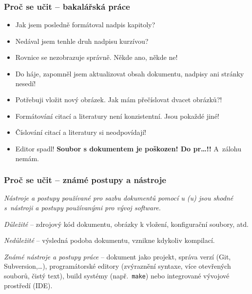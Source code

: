\begin{frame}
	\frametitle{Proč se učit  -- bakalářská práce}
	\begin{itemize}
		\item Jak jsem posledně formátoval nadpis kapitoly?
		\item Nedával jsem tenhle druh nadpisu kurzívou?
		\item Rovnice se nezobrazuje správně. Někde ano, někde ne!
		\item Do háje, zapomněl jsem aktualizovat obsah dokumentu, nadpisy ani stránky nesedí!
		\item Potřebuji vložit nový obrázek. Jak mám přečíslovat dvacet obrázků?!
		\item Formátování citací a literatury není konzistentní. Jsou pokaždé jiné!
		\item Číslování citací a literatury si neodpovídají!
		\item Editor spadl! \alert{\textbf{Soubor s dokumentem je poškozen! Do pr\ldots!!}} A~zálohu nemám.
	\end{itemize}
\end{frame}


\begin{frame}
	\frametitle{Proč se učit  -- známé postupy a nástroje}
	\begin{center}
		\emph{Nástroje a postupy používané pro sazbu dokumentů pomocí u (u) jsou shodné s~nástroji a postupy používanými pro vývoj software.}
	\end{center}
	\emph{Důležité} -- zdrojový kód dokumentu, obrázky k vložení, konfigurační soubory, atd.\par
	\emph{Nedůležité} -- výsledná podoba dokumentu, vznikne kdykoliv kompilací.\par
	\emph{Známé nástroje a postupy práce} -- dokument jako projekt, správa verzí (Git, Subversion,\ldots), programátorské editory (zvýraznění syntaxe, více otevřených souborů, čistý text), build systémy (např.\ \texttt{make}) nebo integrované vývojové prostředí (IDE).
\end{frame}


